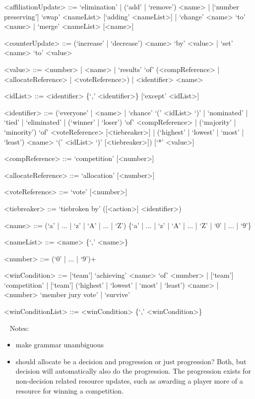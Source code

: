 \documentclass{article}
\begin{document}
\begin{grammar}
<affiliationUpdate> ::= `elimination' | (`add' | `remove') <name> | 
[`number preserving'] `swap' <nameList> [`adding' <nameList>] | `change' <name> 
`to' <name> | `merge' <nameList> [<name>]

<counterUpdate> ::= (`increase' | `decrease') <name> `by' <value> | `set' 
<name> `to' <value> 

<value> ::= <number> | <name> | `results' `of' (<compReference> | 
<allocateReference> |
<voteReference>) | <identifier> <name> %

<idList> ::= <identifier> \{`,' <identifier>\} [`except' <idList>]

<identifier> ::= (`everyone' | <name> | `chance' `(' <idList> `)' | `nominated' 
| 
`tied' | 
`eliminated' | (`winner' | `loser') `of' <compReference> | (`majority' | 
`minority') `of' <voteReference>  [<tiebreaker>] | (`highest' | `lowest' | 
`most' | `least') <name> `(' <idList> `)' [<tiebreaker>]) 
[`*' <value>]

<compReference> ::= `competition' [<number>] 

<allocateReference> ::= `allocation' [<number>]

<voteReference> ::= `vote' [<number>]

<tiebreaker> ::= `tiebroken by' ([<action>] <identifier>)

<name> ::= (`a' | ... | `z' | `A' | ... | `Z') \{`a' | ... | `z' | `A' | ... | 
`Z' | `0' | ... | `9'\}

<nameList> ::= <name> \{`,' <name>\}

<number> ::= (`0' | ... | `9')+

<winCondition> ::= [`team'] `achieving' <name> `of' <number> | [`team'] 
`competition' | [`team'] (`highest' | `lowest' | `most' | `least') <name> | 
<number> `member jury vote' | `survive'

<winConditionList> ::= <winCondition> \{`,' <winCondition>\}

\end{grammar}

~\newline
Notes:
\begin{itemize}
	\item make grammar unambiguous
	\item should allocate be a decision and progression or just progression? 
	Both, but decision will automatically also do the progression. The 
	progression exists for non-decision related resource updates, such as 
	awarding a player more of a resource for winning a competition.
\end{itemize}
\end{document}
